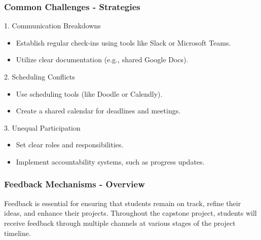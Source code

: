 \documentclass[aspectratio=169]{beamer}
\begin{document}
\begin{frame}[fragile]
  \frametitle{Common Challenges - Strategies}
  \begin{block}{1. Communication Breakdowns}
    \begin{itemize}
      \item Establish regular check-ins using tools like Slack or Microsoft Teams.
      \item Utilize clear documentation (e.g., shared Google Docs).
    \end{itemize}
  \end{block}

  \begin{block}{2. Scheduling Conflicts}
    \begin{itemize}
      \item Use scheduling tools (like Doodle or Calendly).
      \item Create a shared calendar for deadlines and meetings.
    \end{itemize}
  \end{block}

  \begin{block}{3. Unequal Participation}
    \begin{itemize}
      \item Set clear roles and responsibilities.
      \item Implement accountability systems, such as progress updates.
    \end{itemize}
  \end{block}
\end{frame}

\begin{frame}[fragile]
  \frametitle{Feedback Mechanisms - Overview}
  Feedback is essential for ensuring that students remain on track, refine their ideas, and enhance their projects. 
  Throughout the capstone project, students will receive feedback through multiple channels at various stages of the project timeline.
\end{frame}
\end{document}
